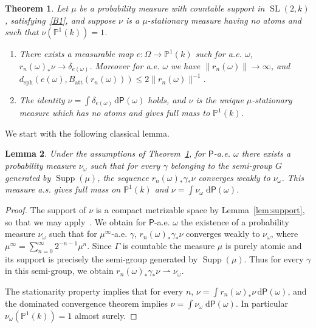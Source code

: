 \documentclass[11pt]{article}
\newtheorem{theo}{Theorem}[section]
\newtheorem{lemm}[theo]{Lemma}
\theoremstyle{definition}
\numberwithin{equation}{section}
\numberwithin{figure}{section}
\numberwithin{table}{section}
\DeclareMathOperator{\supp}{Supp}
\DeclareMathOperator{\SL}{SL}
\newcommand{\prob}{\mathsf{P}}
\newcommand{\cvf}{\rightharpoonup}
\newcommand{\PP}{\mathbb{P}}
\newcommand{\att}{\mathrm{att}}
\newcommand{\SLk}{\SL(2,k)}
\newcommand*{\dd}{\mathrm{d}}
\newcommand*{\dprob}{\dd \prob}
\begin{document}
\begin{theo}\label{thm:partial unique}
Let $\mu$ be a probability measure with countable support in $\SLk$, satisfying~\eqref{B1}, and suppose $\nu$ is a $\mu$-stationary measure having no atoms and such that $\nu(\PP^1(k)) = 1$.
\begin{enumerate}
\item There exists a measurable map $e: \Omega \to \PP^1(k)$ such for a.e. $\omega$, $r_n(\omega)_* \nu \to \delta_{e(\omega)}$. Moreover for a.e. $\omega$ we have $\|r_n(\omega)\| \to \infty$, and $d_{\mathrm{sph}}(e(\omega), B_\att(r_n(\omega))) \le 2 \|r_n(\omega)\|^{-1}$.
\item The identity $\nu = \int \delta_{e(\omega)} \, \dprob(\omega)$ holds, and $\nu$ is the unique $\mu$-stationary measure which has no atoms and gives full mass to $\PP^1(k)$.
\end{enumerate}
\end{theo}

We start with the following classical lemma.

\begin{lemm}\label{lem:guivarch raugi}
Under the assumptions of Theorem~\ref{thm:partial unique}, for $\prob$-a.e. $\omega$ there exists a probability measure $\nu_\omega$ such that for every $\gamma$ belonging to the semi-group $G$ generated by $\supp(\mu)$, the sequence $r_n(\omega)_*\gamma_*\nu$ converges weakly to $\nu_\omega$. This measure a.s. gives full mass on $\PP^1(k)$ and $\nu = \int \nu_\omega \; \dprob(\omega)$.
\end{lemm}

\begin{proof}
The support of $\nu$ is a compact metrizable space by Lemma~\ref{lem:support}, so that we may apply~\cite[Lem.~2.1, p.~19]{bougerol-lacroix}. We obtain for $\prob$-a.e. $\omega$ the existence of a probability measure $\nu_\omega$ such that for $\mu^\infty$-a.e. $\gamma$, $r_n(\omega)_*\gamma_*\nu$ converges weakly to $\nu_\omega$, where $\mu^\infty = \sum_{n = 0}^\infty 2^{-n-1}\mu^n$. Since $\Gamma$ is countable the measure $\mu$ is purely atomic and its support is precisely the semi-group generated by $\supp(\mu)$. Thus for every $\gamma$ in this semi-group, we obtain $r_n(\omega)_*\gamma_*\nu \cvf \nu_\omega$.

The stationarity property implies that for every $n$, $\nu = \int r_n(\omega)_* \nu\, \dprob(\omega)$, and the dominated convergence theorem implies $\nu = \int \nu_\omega \; \dprob(\omega)$. In particular $\nu_\omega(\PP^1(k)) =1$ almost surely.
\end{proof}
\end{document}
